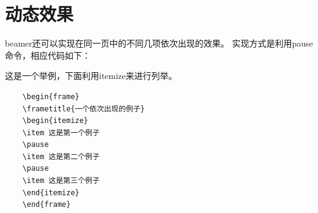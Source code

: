 \section{动态效果}

beamer还可以实现在同一页中的不同几项依次出现的效果。
实现方式是利用pause命令，相应代码如下：

这是一个举例，下面利用itemize来进行列举。

{
	\linespread{1}
	\noindent
	\begin{verbatim}
	\begin{frame}
	\frametitle{一个依次出现的例子}		
	\begin{itemize}
	\item 这是第一个例子
	\pause
	\item 这是第二个例子
	\pause
	\item 这是第三个例子
	\end{itemize}
	\end{frame}
	\end{verbatim}
}
